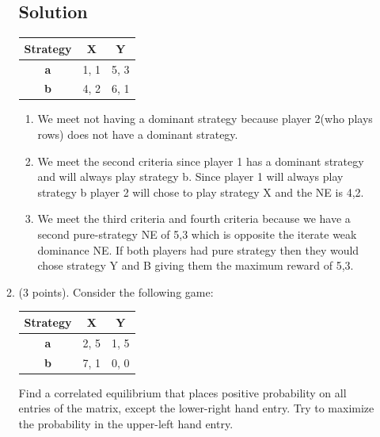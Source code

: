 \documentclass[11pt]{article}
\begin{document}
\begin{enumerate}
\begin{enumerate}
\subsection{Solution}
\begin{center}
\begin{tabular}{| c |  c | c |}
\hline
\textbf{Strategy} & \textbf{X} & \textbf{Y}\\ \hline \hline
\textbf{a} & 1, 1 & 5, 3 \\ \hline
\textbf{b} & 4, 2 & 6, 1 \\ \hline
\end{tabular}
\end{center}
\begin{enumerate}
\item We meet not having a dominant strategy because  player 2(who plays rows) does not have a dominant strategy.
\item We meet the second criteria since player 1 has a dominant strategy and will always play strategy b. Since player 1 will always play strategy b player 2 will chose to play strategy X and the NE is 4,2.
\item We meet the third criteria and fourth criteria because we have a second pure-strategy NE of 5,3 which is opposite the iterate weak dominance NE. If both players had pure strategy then they would chose strategy Y and B giving them the maximum reward of 5,3.
\end{enumerate}
\item (3 points). Consider the following game:
\begin{center}
\begin{tabular}{| c | c | c |}
\hline
\textbf{Strategy} & \textbf{X} & \textbf{Y}\\ \hline \hline
\textbf{a} &2, 5 & 1, 5 \\ \hline
\textbf{b} &7, 1 & 0, 0 \\
\hline
\end{tabular}
\end{center}
Find a correlated equilibrium that places positive probability on all entries of the matrix, except the lower-right hand entry. Try to maximize the probability in the upper-left hand entry.
\end{enumerate}

\end{enumerate}
\end{document}
